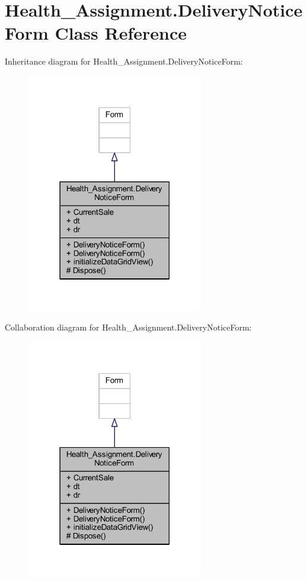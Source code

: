 \hypertarget{class_health___assignment_1_1_delivery_notice_form}{}\section{Health\+\_\+\+Assignment.\+Delivery\+Notice\+Form Class Reference}
\label{class_health___assignment_1_1_delivery_notice_form}


Inheritance diagram for Health\+\_\+\+Assignment.\+Delivery\+Notice\+Form\+:\nopagebreak
\begin{figure}[H]
\begin{center}
\leavevmode
\includegraphics[width=218pt]{class_health___assignment_1_1_delivery_notice_form__inherit__graph}
\end{center}
\end{figure}


Collaboration diagram for Health\+\_\+\+Assignment.\+Delivery\+Notice\+Form\+:\nopagebreak
\begin{figure}[H]
\begin{center}
\leavevmode
\includegraphics[width=218pt]{class_health___assignment_1_1_delivery_notice_form__coll__graph}
\end{center}
\end{figure}

